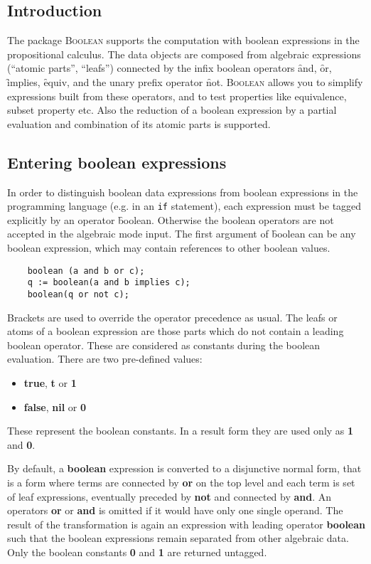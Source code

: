 

\subsection{Introduction}

The package \textsc{Boolean} supports the computation with
boolean expressions in the propositional calculus.
The data objects are composed from algebraic expressions (``atomic parts'', ``leafs'')
connected by the infix boolean operators \f{and}, \f{or}, 
\f{implies}, \f{equiv}, and the unary prefix operator
\f{not}. \textsc{Boolean} allows you to simplify expressions
built from these operators, and to test properties like
equivalence, subset property etc. Also the reduction of
a boolean expression by a partial evaluation and combination
of its atomic parts is supported.

\subsection{Entering boolean expressions}

In order to distinguish boolean data expressions from 
boolean expressions in the \REDUCE programming
language (e.g. in an \texttt{if} statement), each expression
must be tagged explicitly by an operator \f{boolean}.
Otherwise the boolean operators are not accepted in the
\REDUCE  algebraic mode input.
The first argument of \f{boolean} can be any boolean expression,
which may contain references to other boolean values.
\begin{verbatim}
    boolean (a and b or c);
    q := boolean(a and b implies c);
    boolean(q or not c);
\end{verbatim}
Brackets are used to override the operator precedence as usual.
The leafs or atoms of a boolean expression are those parts which
do not contain a leading boolean operator. These are
considered as constants during the boolean evaluation. There
are two pre-defined values:
\begin{itemize}
\item {\bf true}, {\bf t} or {\bf 1}
\item {\bf false}, {\bf nil} or {\bf 0}
\end{itemize}
These represent the boolean constants. In a result
form they are used only as {\bf 1} and {\bf 0}.

By default, a {\bf boolean} expression is converted  to a
disjunctive normal form, that is a form where terms are connected
by {\bf or} on the top level and each term is set of leaf
expressions, eventually preceded by {\bf not} and connected
by  {\bf and}. An operators {\bf or} or {\bf and} is omitted
if it would have only one single operand. The result of
the transformation is again an expression with leading 
operator {\bf boolean} such that the boolean expressions
remain separated from other algebraic data. Only the boolean
constants {\bf 0} and {\bf 1} are returned untagged.

